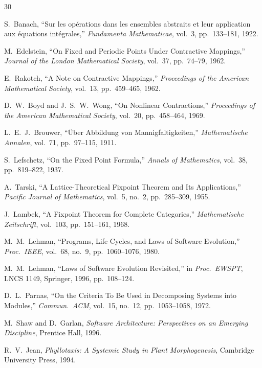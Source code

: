 \documentclass[12pt]{article}
\begin{document}
\begin{thebibliography}{30}

S.~Banach, ``Sur les op\'erations dans les ensembles abstraits et leur application aux \'equations int\'egrales,'' \emph{Fundamenta Mathematicae}, vol.~3, pp.~133--181, 1922.

M.~Edelstein, ``On Fixed and Periodic Points Under Contractive Mappings,'' \emph{Journal of the London Mathematical Society}, vol.~37, pp.~74--79, 1962.

E.~Rakotch, ``A Note on Contractive Mappings,'' \emph{Proceedings of the American Mathematical Society}, vol.~13, pp.~459--465, 1962.

D.~W.~Boyd and J.~S.~W.~Wong, ``On Nonlinear Contractions,'' \emph{Proceedings of the American Mathematical Society}, vol.~20, pp.~458--464, 1969.

L.~E.~J.~Brouwer, ``\"Uber Abbildung von Mannigfaltigkeiten,'' \emph{Mathematische Annalen}, vol.~71, pp.~97--115, 1911.

S.~Lefschetz, ``On the Fixed Point Formula,'' \emph{Annals of Mathematics}, vol.~38, pp.~819--822, 1937.

A.~Tarski, ``A Lattice-Theoretical Fixpoint Theorem and Its Applications,'' \emph{Pacific Journal of Mathematics}, vol.~5, no.~2, pp.~285--309, 1955.

J.~Lambek, ``A Fixpoint Theorem for Complete Categories,'' \emph{Mathematische Zeitschrift}, vol.~103, pp.~151--161, 1968.

M.~M.~Lehman, ``Programs, Life Cycles, and Laws of Software Evolution,'' \emph{Proc.\ IEEE}, vol.~68, no.~9, pp.~1060--1076, 1980.

M.~M.~Lehman, ``Laws of Software Evolution Revisited,'' in \emph{Proc.\ EWSPT}, LNCS 1149, Springer, 1996, pp.~108--124.

D.~L.~Parnas, ``On the Criteria To Be Used in Decomposing Systems into Modules,'' \emph{Commun.\ ACM}, vol.~15, no.~12, pp.~1053--1058, 1972.

M.~Shaw and D.~Garlan, \emph{Software Architecture: Perspectives on an Emerging Discipline}, Prentice Hall, 1996.

R.~V.~Jean, \emph{Phyllotaxis: A Systemic Study in Plant Morphogenesis}, Cambridge University Press, 1994.


\end{thebibliography}
\end{document}
